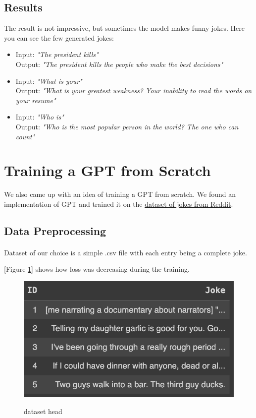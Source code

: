 \documentclass[12pt]{article}
\begin{document}
\subsection{Results}
The result is not impressive, but sometimes the model makes funny jokes.
Here you can see the few generated jokes:
\begin{itemize}
    \item Input: \textit{"The president kills"} \\
    Output: \textit{"The president kills the people who make the best decisions"}
    \item Input: \textit{"What is your"} \\
    Output: \textit{"What is your greatest weakness? Your inability to read the words on your resume"}
    \item Input: \textit{"Who is"} \\
    Output: \textit{"Who is the most popular person in the world? The one who can count"}
\end{itemize}

\section{Training a GPT from Scratch}

We also came up with an idea of training a GPT from scratch. We found an implementation of GPT and trained it on the \href{https://www.kaggle.com/datasets/abhinavmoudgil95/short-jokes}{dataset
of jokes from Reddit}.

\subsection{Data Preprocessing}

\paragraph{}
Dataset of our choice is a simple .csv file with each entry being a complete joke.

[Figure \ref{pic:df-head}] shows how loss was decreasing during the training.

\begin{figure}[ht]
\caption{dataset head}
\includegraphics[width=\textwidth]{img/dataset_head.png}
\label{pic:df-head}
\end{figure}
\end{document}

